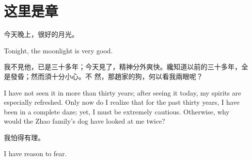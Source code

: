 \documentclass[fontset=none, punct=kaiming]{ctexbook}
\begin{document}
\chapter{这里是章}

\begin{paracol}{2}[]

今天晚上，很好的月光。

\switchcolumn

Tonight, the moonlight is very good.

\switchcolumn

我不見他，已是三十多年；今天見了，精神分外爽快。纔知道以前的三十多年，全是發昏；然而須十分小心。不
然，那趙家的狗，何以看我兩眼呢？

\switchcolumn

I have not seen it in more than thirty years; after seeing it today, my spirits are especially
refreshed. Only now do I realize that for the past thirty years, I have been in a complete daze;
yet, I must be extremely cautious. Otherwise, why would the Zhao family's dog have looked at me
twice?

\switchcolumn*

我怕得有理。

\switchcolumn

I have reason to fear.

\end{paracol}
\end{document}
